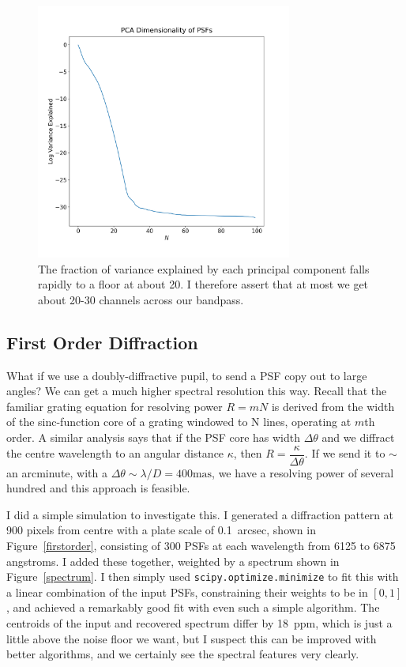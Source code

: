 \documentclass[a4paper,12pt]{article}
\begin{document}
\begin{figure}
\centering
\includegraphics[width=0.75\textwidth]{dimension.png}
\caption{The fraction of variance explained by each principal component falls rapidly to a floor at about 20. I therefore assert that at most we get about 20-30 channels across our bandpass.}
\label{zeroth}
\end{figure}

\subsection{First Order Diffraction}

What if we use a doubly-diffractive pupil, to send a PSF copy out to large angles? We can get a much higher spectral resolution this way. Recall that the familiar grating equation for resolving power $R = mN$ is derived from the width of the sinc-function core of a grating windowed to N lines, operating at $m$th order. A similar analysis says that if the PSF core has width $\Delta \theta$ and we diffract the centre wavelength to an angular distance $\kappa$, then $R = \dfrac{\kappa}{\Delta \theta}$. If we send it to $\sim$ an arcminute, with a $\Delta\theta \sim \lambda/D = 400\text{mas}$, we have a resolving power of several hundred and this approach is feasible.

I did a simple simulation to investigate this. I generated a diffraction pattern at 900 pixels from centre with a plate scale of 0.1~arcsec, shown in Figure~\ref{firstorder}, consisting of 300 PSFs at each wavelength from 6125 to 6875 angstroms. I added these together, weighted by a spectrum shown in Figure~\ref{spectrum}. I then simply used \texttt{scipy.optimize.minimize} to fit this with a linear combination of the input PSFs, constraining their weights to be in $[0,1]$, and achieved a remarkably good fit with even such a simple algorithm. The centroids of the input and recovered spectrum differ by 18~ppm, which is just a little above the noise floor we want, but I suspect this can be improved with better algorithms, and we certainly see the spectral features very clearly.
\end{document}
